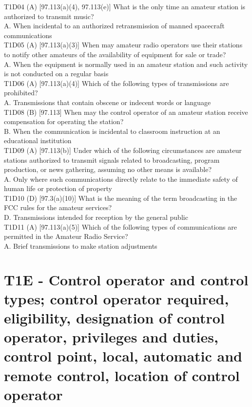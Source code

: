 \documentclass[12pt,letterpaper]{report}
\begin{document}
T1D04 (A) [97.113(a)(4), 97.113(e)] What is the only time an amateur station is authorized to transmit music?\\
A. When incidental to an authorized retransmission of manned spacecraft communications\\

T1D05 (A) [97.113(a)(3)] When may amateur radio operators use their stations to notify other amateurs of the availability of equipment for sale or trade?\\
A. When the equipment is normally used in an amateur station and such activity is not conducted on a regular basis\\

T1D06 (A) [97.113(a)(4)] Which of the following types of transmissions are prohibited?\\
A. Transmissions that contain obscene or indecent words or language\\

T1D08 (B) [97.113] When may the control operator of an amateur station receive compensation for operating the station? \\
B. When the communication is incidental to classroom instruction at an educational institution\\

T1D09 (A) [97.113(b)] Under which of the following circumstances are amateur stations authorized to transmit signals related to broadcasting, program production, or news gathering, assuming no other means is available?\\
A. Only where such communications directly relate to the immediate safety of human life or protection of property\\

T1D10 (D) [97.3(a)(10)] What is the meaning of the term broadcasting in the FCC rules for the amateur services?\\
D. Transmissions intended for reception by the general public \\

T1D11 (A) [97.113(a)(5)] Which of the following types of communications are permitted in the Amateur Radio Service?\\
A. Brief transmissions to make station adjustments\\

\section{T1E - Control operator and control types; control operator required, eligibility, designation of control operator, privileges and duties, control point, local, automatic and remote control, location of control operator}
\end{document}
